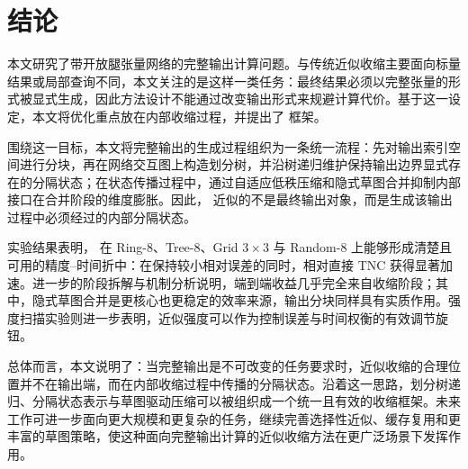 \section{结论}
本文研究了带开放腿张量网络的完整输出计算问题。与传统近似收缩主要面向标量结果或局部查询不同，本文关注的是这样一类任务：最终结果必须以完整张量的形式被显式生成，因此方法设计不能通过改变输出形式来规避计算代价。基于这一设定，本文将优化重点放在内部收缩过程，并提出了 \ours{} 框架。

围绕这一目标，本文将完整输出的生成过程组织为一条统一流程：先对输出索引空间进行分块，再在网络交互图上构造划分树，并沿树递归维护保持输出边界显式存在的分隔状态；在状态传播过程中，通过自适应低秩压缩和隐式草图合并抑制内部接口在合并阶段的维度膨胀。因此，\ours{} 近似的不是最终输出对象，而是生成该输出过程中必须经过的内部分隔状态。

实验结果表明，\ours{} 在 Ring-8、Tree-8、Grid $3\times 3$ 与 Random-8 上能够形成清楚且可用的精度--时间折中：在保持较小相对误差的同时，相对直接 TNC 获得显著加速。进一步的阶段拆解与机制分析说明，端到端收益几乎完全来自收缩阶段；其中，隐式草图合并是更核心也更稳定的效率来源，输出分块同样具有实质作用。强度扫描实验则进一步表明，近似强度可以作为控制误差与时间权衡的有效调节旋钮。

总体而言，本文说明了：当完整输出是不可改变的任务要求时，近似收缩的合理位置并不在输出端，而在内部收缩过程中传播的分隔状态。沿着这一思路，划分树递归、分隔状态表示与草图驱动压缩可以被组织成一个统一且有效的收缩框架。未来工作可进一步面向更大规模和更复杂的任务，继续完善选择性近似、缓存复用和更丰富的草图策略，使这种面向完整输出计算的近似收缩方法在更广泛场景下发挥作用。